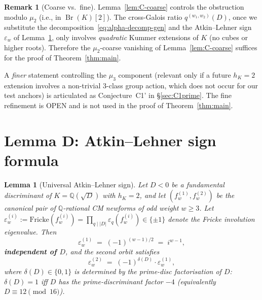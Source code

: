 \documentclass[11pt,a4paper]{amsart}
\theoremstyle{plain}
\newtheorem{lemma}[theorem]{Lemma}
\theoremstyle{definition}
\newtheorem{remark}[theorem]{Remark}
\DeclareMathOperator{\Br}{Br}
\newcommand{\Q}{\mathbb{Q}}
\newcommand{\absD}{\lvert D\rvert}
\newcommand{\eqdef}{:=}
\newcommand{\fl}[2]{f_{#1}^{(#2)}}
\newcommand{\qstr}[2]{q^{(#1,#2)}}
\begin{document}
\begin{remark}[Coarse vs.\ fine]\label{rk:coarse-fine}
Lemma~\ref{lem:C-coarse} controls the obstruction modulo $\mu_2$
(i.e., in $\Br(K)[2]$).  The cross-Galois ratio $\qstr{w_1}{w_2}(D)$,
once we substitute the decomposition~\eqref{eq:alpha-decomp-gen} and
the Atkin--Lehner sign $\varepsilon_w$ of
Lemma~\ref{lem:D}, only involves \emph{quadratic} Kummer extensions
of $K$ (no cubes or higher roots).  Therefore the
$\mu_2$-coarse vanishing of Lemma~\ref{lem:C-coarse} suffices for the
proof of Theorem~\ref{thm:main}.

A \emph{finer} statement controlling the $\mu_3$ component
(relevant only if a future $h_K = 2$ extension involves a non-trivial
$3$-class group action, which does not occur for our test anchors) is
articulated as Conjecture~C1' in \S\ref{sec:C1prime}.  The fine
refinement is OPEN and is not used in the proof of
Theorem~\ref{thm:main}.
\end{remark}

\section{Lemma D: Atkin--Lehner sign formula}\label{sec:lemma-D}

\begin{lemma}[Universal Atkin--Lehner sign]\label{lem:D}
Let $D < 0$ be a fundamental discriminant of $K = \Q(\sqrt{D})$ with
$h_K = 2$, and let $(\fl{w}{1}, \fl{w}{2})$ be the canonical pair
of $\Q$-rational CM newforms of odd weight $w \ge 3$.  Let
$\varepsilon_w^{(i)} \eqdef \mathrm{Fricke}(\fl{w}{i}) =
\prod_{q \mid \absD} \varepsilon_q(\fl{w}{i}) \in \{\pm 1\}$ denote the
Fricke involution eigenvalue.  Then
\begin{equation}\label{eq:eps-univ}
   \varepsilon_w^{(1)} \;=\; (-1)^{(w-1)/2}
   \;=\; i^{w-1},
\end{equation}
\textbf{independent of $D$}, and the second orbit satisfies
\begin{equation}\label{eq:eps-swap}
   \varepsilon_w^{(2)} \;=\; (-1)^{\delta(D)} \cdot \varepsilon_w^{(1)},
\end{equation}
where $\delta(D) \in \{0, 1\}$ is determined by the prime-disc
factorisation of $D$: $\delta(D) = 1$ iff $D$ has the
prime-discriminant factor $-4$ \textup{(}equivalently
$D \equiv 12 \pmod{16}$\textup{)}.
\end{lemma}
\end{document}
